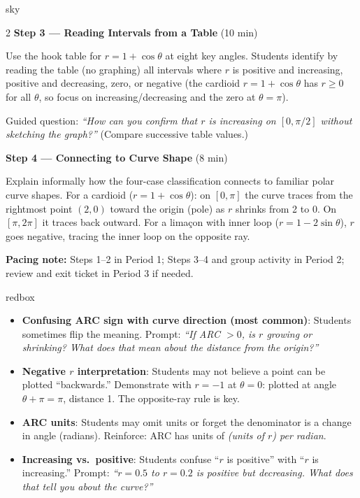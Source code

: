 \documentclass[10pt]{article}
\begin{document}
\begin{skillbox}{sky}
\begin{multicols}{2}
\textbf{Step 3 --- Reading Intervals from a Table} (10 min)

Use the hook table for $r = 1 + \cos\theta$ at eight key angles. Students
identify by reading the table (no graphing) all intervals where $r$ is
positive and increasing, positive and decreasing, zero, or negative (the
cardioid $r = 1 + \cos\theta$ has $r \geq 0$ for all $\theta$, so focus
on increasing/decreasing and the zero at $\theta = \pi$).

Guided question: \textit{``How can you confirm that $r$ is increasing on $[0, \pi/2]$
without sketching the graph?''} (Compare successive table values.)

\columnbreak

\textbf{Step 4 --- Connecting to Curve Shape} (8 min)

Explain informally how the four-case classification connects to familiar polar
curve shapes. For a cardioid ($r = 1 + \cos\theta$): on $[0, \pi]$ the curve
traces from the rightmost point $(2, 0)$ toward the origin (pole) as $r$ shrinks
from 2 to 0. On $[\pi, 2\pi]$ it traces back outward. For a limaçon with inner
loop ($r = 1 - 2\sin\theta$), $r$ goes negative, tracing the inner loop on the
opposite ray.

\end{multicols}

\smallskip
\textbf{Pacing note:} Steps 1--2 in Period 1; Steps 3--4 and group
activity in Period 2; review and exit ticket in Period 3 if needed.
\end{skillbox}

\vspace{0.08in}

\begin{skillbox}{redbox}
\begin{itemize}[leftmargin=1.4em, itemsep=3pt]
  \item \textbf{Confusing ARC sign with curve direction (most common)}: Students
    sometimes flip the meaning. Prompt: \textit{``If ARC $> 0$, is $r$ growing or
    shrinking? What does that mean about the distance from the origin?''}
  \item \textbf{Negative $r$ interpretation}: Students may not believe a point can be
    plotted ``backwards.'' Demonstrate with $r = -1$ at $\theta = 0$: plotted at angle
    $\theta + \pi = \pi$, distance 1. The opposite-ray rule is key.
  \item \textbf{ARC units}: Students may omit units or forget the denominator is a
    change in angle (radians). Reinforce: ARC has units of
    \textit{(units of $r$) per radian}.
  \item \textbf{Increasing vs.\ positive}: Students confuse ``$r$ is positive'' with
    ``$r$ is increasing.'' Prompt: \textit{``$r = 0.5$ to $r = 0.2$ is positive but
    \emph{decreasing}. What does that tell you about the curve?''}
\end{itemize}
\end{skillbox}
\end{document}
